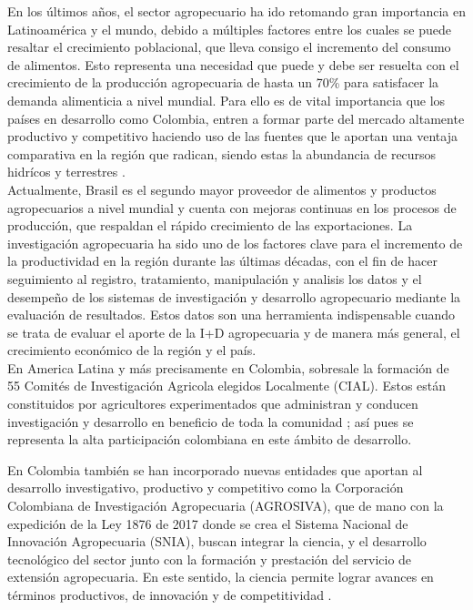
En los últimos años, el sector agropecuario ha ido retomando gran importancia en Latinoamérica y el mundo, debido a múltiples factores entre los cuales se puede resaltar el crecimiento poblacional, que lleva consigo el incremento del consumo de alimentos. Esto representa una necesidad que puede y debe ser resuelta con el crecimiento de la producción agropecuaria de hasta un 70\% para satisfacer la demanda alimenticia a nivel mundial. Para ello es de vital importancia que los países en desarrollo como Colombia, entren a formar parte del mercado altamente productivo y competitivo haciendo uso de las fuentes que le aportan una ventaja comparativa en la región que radican, siendo estas la abundancia de recursos hidrícos y terrestres \cite{fao}.\\

Actualmente, Brasil es el segundo mayor proveedor de alimentos y productos agropecuarios a nivel mundial y cuenta con mejoras continuas en los procesos de producción, que respaldan el rápido crecimiento de las exportaciones. La investigación agropecuaria ha sido uno de los factores clave para el incremento de la productividad en la región durante las últimas décadas, con el fin de hacer seguimiento al registro, tratamiento, manipulación y analisis  los datos y el desempeño de los sistemas de investigación y desarrollo agropecuario mediante la evaluación de resultados. Estos datos son una herramienta indispensable cuando se trata de evaluar el aporte de la I+D agropecuaria y de manera más general, el crecimiento económico de la región y el país.\\

En America Latina y más precisamente en Colombia, sobresale la formación de 55 Comités de Investigación Agricola elegidos Localmente (CIAL). Estos están constituidos por agricultores experimentados que administran y conducen investigación y desarrollo en beneficio de toda la comunidad \cite{ashby}; así pues se representa la alta participación colombiana en este ámbito de desarrollo.

En Colombia también se han incorporado nuevas entidades que aportan al desarrollo investigativo, productivo y competitivo como la Corporación Colombiana de Investigación Agropecuaria (AGROSIVA), que de mano con la expedición de la Ley 1876 de 2017 donde se crea el Sistema Nacional de Innovación Agropecuaria (SNIA), buscan integrar la ciencia, y el desarrollo tecnológico del sector junto con la formación y prestación del servicio de extensión agropecuaria. En este sentido, la ciencia permite lograr avances en términos productivos, de innovación y de competitividad \cite{minagricultura}.\\

